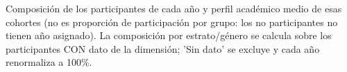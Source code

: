 Composición de los participantes de cada año y perfil académico medio de esas cohortes (no es proporción de participación por grupo: los no participantes no tienen año asignado). La composición por estrato/género se calcula sobre los participantes CON dato de la dimensión; 'Sin dato' se excluye y cada año renormaliza a 100\%.
